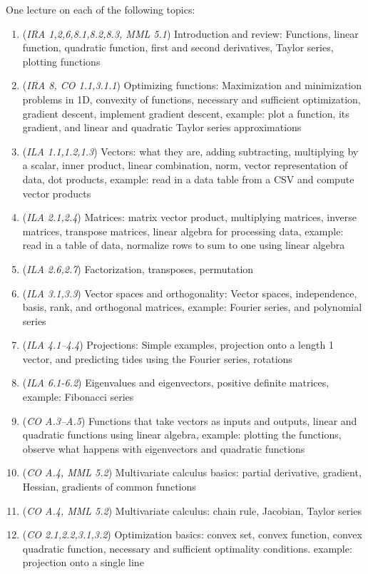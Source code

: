 \documentclass[11pt]{article}
\begin{document}
One lecture on each of the following topics:
\begin{enumerate}
\item (\emph{IRA 1,2,6,8.1,8.2,8.3, MML 5.1}) Introduction and review: Functions, linear function, quadratic function, first and second derivatives, Taylor series, plotting functions
\item (\emph{IRA 8, CO 1.1,3.1.1}) Optimizing functions: Maximization and minimization problems in 1D, convexity of functions, necessary and sufficient optimization, gradient descent, implement gradient descent, example: plot a function, its gradient, and linear and quadratic Taylor series approximations
\item (\emph{ILA 1.1,1.2,1.3}) Vectors: what they are, adding subtracting, multiplying by a scalar, inner product, linear combination, norm, vector representation of data, dot products, example: read in a data table from a CSV and compute vector products
\item (\emph{ILA 2.1,2.4}) Matrices: matrix vector product, multiplying matrices, inverse matrices, transpose matrices, linear algebra for processing data, example: read in a table of data, normalize rows to sum to one using linear algebra
\item (\emph{ILA 2.6,2.7}) Factorization, transposes, permutation
\item (\emph{ILA 3.1,3.3}) Vector spaces and orthogonality: Vector spaces, independence, basis, rank, and orthogonal matrices, example: Fourier series, and polynomial series
\item (\emph{ILA 4.1--4.4}) Projections: Simple examples, projection onto a length 1 vector, and predicting tides using the Fourier series, rotations
\item (\emph{ILA 6.1-6.2}) Eigenvalues and eigenvectors, positive definite matrices, example: Fibonacci series
\item (\emph{CO A.3--A.5}) Functions that take vectors as inputs and outputs, linear and quadratic functions using linear algebra, example: plotting the functions, observe what happens with eigenvectors and quadratic functions
\item (\emph{CO A.4, MML 5.2}) Multivariate calculus basics: partial derivative, gradient, Hessian, gradients of common functions
\item (\emph{CO A.4, MML 5.2}) Multivariate calculus: chain rule, Jacobian, Taylor series 
\item (\emph{CO 2.1,2.2,3.1,3.2}) Optimization basics: convex set, convex function, convex quadratic function, necessary and sufficient optimality conditions. example: projection onto a single line

\end{enumerate}
\end{document}
